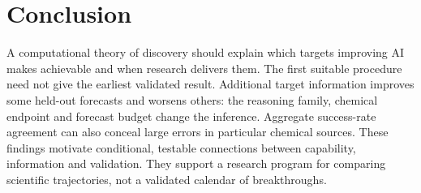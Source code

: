 \section{Conclusion}
A computational theory of discovery should explain which targets improving AI makes achievable and when research delivers them. The first suitable procedure need not give the earliest validated result. Additional target information improves some held-out forecasts and worsens others: the reasoning family, chemical endpoint and forecast budget change the inference. Aggregate success-rate agreement can also conceal large errors in particular chemical sources. These findings motivate conditional, testable connections between capability, information and validation. They support a research program for comparing scientific trajectories, not a validated calendar of breakthroughs.
